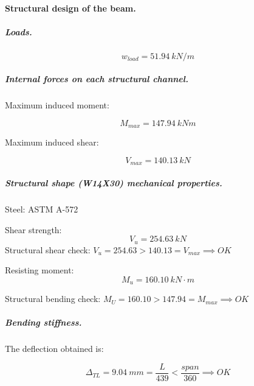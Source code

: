 \paragraph{Structural design of the beam.}

\subparagraph{Loads.}

\begin{equation}
  w_{load}= 51.94\ kN/m
\end{equation}

\subparagraph{Internal forces on each structural channel.}

\noindent Maximum induced moment:

\begin{equation}
  M_{max}= 147.94\ kN m
\end{equation}

\noindent Maximum induced shear:

\begin{equation}
  V_{max}= 140.13\ kN
\end{equation}

\subparagraph{Structural shape (W14X30) mechanical properties.}
Steel: ASTM A-572

\noindent Shear strength:
\begin{equation}
  V_u= 254.63\ kN 
\end{equation}
\noindent Structural shear check: $V_u = 254.63 > 140.13 = V_{max} \implies OK$

\noindent Resisting moment:
\begin{equation}
  M_u= 160.10\ kN\cdot m
\end{equation}

\noindent Structural bending check: $M_U = 160.10 > 147.94 = M_{max} \implies OK$

\subparagraph{Bending stiffness.}
The deflection obtained is:

\begin{equation}
  \Delta_{TL}=9.04\ mm= \frac{L}{439} < \frac{span}{360} \implies OK
\end{equation}
